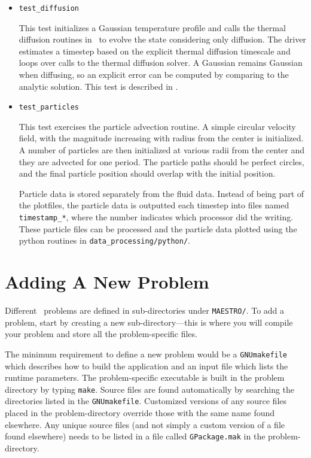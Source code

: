 \begin{itemize}
  
\item {\tt test\_diffusion}

  This test initializes a Gaussian temperature profile and calls
  the thermal diffusion routines in \maestro\ to evolve the state 
  considering only diffusion.  The driver estimates a timestep
  based on the explicit thermal diffusion timescale and loops
  over calls to the thermal diffusion solver.  A Gaussian remains
  Gaussian when diffusing, so an explicit error can be computed
  by comparing to the analytic solution.  This test is 
  described in \cite{xrb}.


\item {\tt test\_particles}

  This test exercises the particle advection routine.  A simple
  circular velocity field, with the magnitude increasing with radius
  from the center is initialized.  A number of particles are then
  initialized at various radii from the center and they are advected
  for one period.  The particle paths should be perfect circles, and
  the final particle position should overlap with the initial
  position.

  Particle data is stored separately from the fluid data.  Instead
  of being part of the plotfiles, the particle data is outputted
  each timestep into files named {\tt timestamp\_*}, where 
  the number indicates which processor did the writing.  These
  particle files can be processed and the particle data plotted
  using the python routines in {\tt data\_processing/python/}.

\end{itemize}


\section{Adding A New Problem}
\label{sec:adding_problems}

Different \maestro\ problems are defined in sub-directories under
{\tt MAESTRO/}.  To add a problem, start by creating a new
sub-directory---this is where you will compile your problem and
store all the problem-specific files.

The minimum requirement to
define a new problem would be a {\tt GNUmakefile} which describes how
to build the application and an input file which lists the runtime
parameters.  The problem-specific executable is built in the problem
directory by typing {\tt make}.  Source files are found automatically
by searching the directories listed in the {\tt GNUmakefile}.
Customized versions of any source files placed in the problem-directory
override those with the same name found elsewhere.  Any unique
source files (and not simply a custom version of a file found
elsewhere) needs to be listed in a file called {\tt GPackage.mak}
in the problem-directory.

